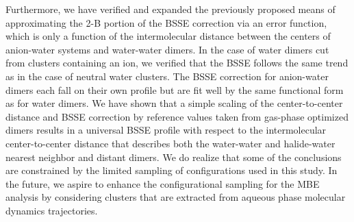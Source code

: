 \documentclass[11pt, proquest]{uwthesis}[2020/02/24]
\begin{document}
\par Furthermore, we have verified and expanded the previously proposed means of approximating the 2-B portion of the BSSE correction via an error function, which is only a function of the intermolecular distance between the centers of anion-water systems and water-water dimers. In the case of water dimers cut from clusters containing an ion, we verified that the BSSE follows the same trend as in the case of neutral water clusters. The BSSE correction for anion-water dimers each fall on their own profile but are fit well by the same functional form as for water dimers. We have shown that a simple scaling of the center-to-center distance and BSSE correction by reference values taken from gas-phase optimized dimers results in a universal BSSE profile with respect to the intermolecular center-to-center distance that describes both the water-water and halide-water nearest neighbor and distant dimers. We do realize that some of the conclusions are constrained by the limited sampling of configurations used in this study. In the future, we aspire to enhance the configurational sampling for the MBE analysis by considering clusters that are extracted from aqueous phase molecular dynamics trajectories.
\end{document}

